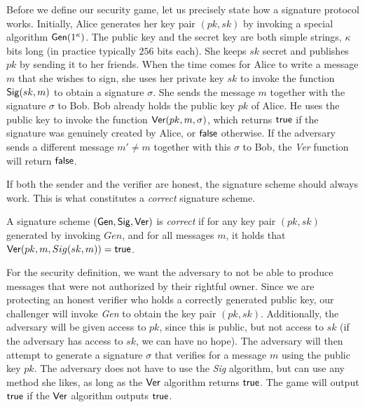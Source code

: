Before we define our security game, let us precisely state how a signature protocol
works. Initially, Alice generates her key pair $(pk, sk)$ by invoking a special algorithm
%
$\mathsf{Gen}(1^\kappa)$. The public key and the secret key are both simple strings, $\kappa$
bits long (in practice typically $256$ bits each).
She keeps $sk$ secret and publishes $pk$ by
sending it to her friends. When the time comes for Alice to write a message $m$
that she wishes to sign, she uses her private key $sk$ to invoke the function
%
$\mathsf{Sig}(sk, m)$
to obtain a signature $\sigma$. She sends the message $m$ together
with the signature $\sigma$ to Bob. Bob already holds the public key $pk$ of Alice.
He uses the public key to invoke the function
%
$\mathsf{Ver}(pk, m, \sigma)$,
which returns
$\textsf{true}$ if the signature was genuinely created by Alice, or $\textsf{false}$ otherwise.
If the adversary sends a different message $m' \neq m$ together with this $\sigma$
to Bob, the \emph{Ver} function will return $\textsf{false}$.

If both the sender and the verifier are honest, the signature scheme should always
work. This is what constitutes a \emph{correct} signature scheme.

\begin{definition}
  A signature scheme $(\mathsf{Gen}, \mathsf{Sig}, \mathsf{Ver})$ is \emph{correct} if
  for any key pair $(pk, sk)$ generated by invoking $Gen$, and
  for all messages $m$, it holds that $\mathsf{Ver}(pk, m, Sig(sk, m)) = \textsf{true}$.
\end{definition}

For the security definition, we want the adversary to not be able to produce
messages that were not authorized by their rightful owner. Since we are protecting
an honest verifier who holds a correctly generated public key, our challenger will
invoke \emph{Gen} to obtain the key pair $(pk, sk)$. Additionally, the adversary will
be given access to $pk$, since this is public, but not access to $sk$ (if the adversary
has access to $sk$, we can have no hope). The adversary will then attempt to generate
a signature $\sigma$ that verifies for a message $m$ using the public key $pk$.
The adversary does not have to use the \emph{Sig} algorithm, but can use any method
she likes, as long as the $\mathsf{Ver}$ algorithm returns $\textsf{true}$. The game will output
$\textsf{true}$ if the $\mathsf{Ver}$ algorithm outputs $\textsf{true}$.

